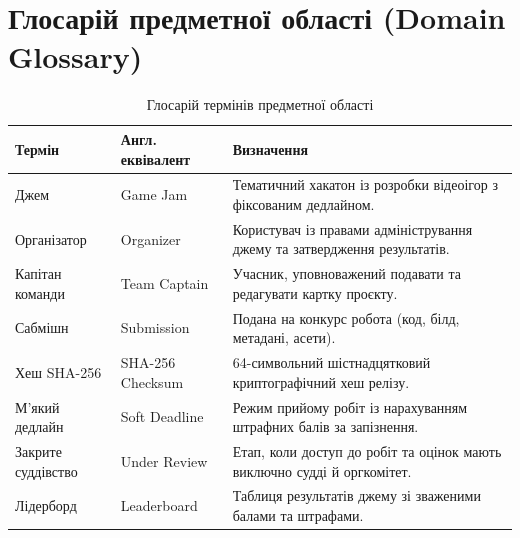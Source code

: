 \documentclass[12pt,a4paper]{article}
\begin{document}
\section{Глосарій предметної області (Domain Glossary)}
\begin{table}[h!]
\centering
\small
\begin{tabularx}{\textwidth}{|l|l|X|}
\hline
\textbf{Термін} & \textbf{Англ. еквівалент} & \textbf{Визначення} \\ \hline
Джем & Game Jam & Тематичний хакатон із розробки відеоігор з фіксованим дедлайном. \\ \hline
Організатор & Organizer & Користувач із правами адміністрування джему та затвердження результатів. \\ \hline
Капітан команди & Team Captain & Учасник, уповноважений подавати та редагувати картку проєкту. \\ \hline
Сабмішн & Submission & Подана на конкурс робота (код, білд, метадані, асети). \\ \hline
Хеш SHA-256 & SHA-256 Checksum & 64-символьний шістнадцятковий криптографічний хеш релізу. \\ \hline
М'який дедлайн & Soft Deadline & Режим прийому робіт із нарахуванням штрафних балів за запізнення. \\ \hline
Закрите суддівство & Under Review & Етап, коли доступ до робіт та оцінок мають виключно судді й оргкомітет. \\ \hline
Лідерборд & Leaderboard & Таблиця результатів джему зі зваженими балами та штрафами. \\ \hline
\end{tabularx}
\caption{Глосарій термінів предметної області}
\end{table}
\end{document}
